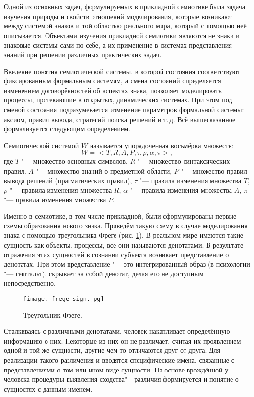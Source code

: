 Одной из основных задач, формулируемых в прикладной семиотике была задача изучения природы и свойств отношений моделирования, которые возникают между системой знаков и той областью реального мира, который с помощью неё описывается. Объектами изучения прикладной семиотики являются не знаки и знаковые системы сами по себе, а  их применение в системах представления знаний при решении различных практических задач.

Введение понятия семиотической системы, в которой состояния соответствуют фиксированным формальным системам, а смена состояний определяется изменением договорённостей об аспектах знака, позволяет моделировать процессы, протекающие в открытых, динамических системах. При этом под сменой состояния подразумевается изменение параметров формальной системы: аксиом, правил вывода, стратегий поиска решений и т.\,д. Всё вышесказанное формализуется следующим определением.

\begin{Def}
	Семиотической системой $W$ называется упорядоченная восьмёрка множеств:
	\[
		W=<T,R,A,P,\tau,\rho,\alpha,\pi>,
	\] 
	где	$T$ "--- множество основных символов, $R$ "--- множество синтаксических правил, $A$ "--- множество знаний о предметной области, $P$ "--- множество правил вывода решений (прагматических правил), $\tau$ "--- правила изменения множества $T$, $\rho$ "--- правила изменения множества $R$, $\alpha$ "--- правила изменения множества $A$, $\pi$ "--- правила изменения множества $P$.
\end{Def}

Именно в семиотике, в том числе прикладной, были сформулированы первые схемы образования нового знака. Приведём такую схему в случае моделирования знака с помощью треугольника Фреге (рис. \ref{fg:frege_sign}). В реальном мире имеются такие сущность как объекты, процессы, все они называются денотатами. В результате отражения этих сущностей в сознании субъекта возникает представление о денотатах. При этом представление "--- это интегрированный образ (в психологии "--- гештальт), скрывает за собой денотат, делая его не доступным непосредственно.

\begin{figure}[h]
	\centering
	\texttt{[image: frege\_sign.jpg]}
	\caption{Треугольник Фреге.}
	\label{fg:frege_sign}
\end{figure}

Сталкиваясь с различными денотатами, человек накапливает определённую информацию о них. Некоторые из них он не различает, считая их проявлением одной и той же сущности, другие чем-то отличаются друг от друга. Для реализации такого различения и вводятся специфические имена, связанные с представлениями о том или ином виде сущности. На основе врождённой у человека процедуры выявления сходства"--~различия формируется и понятие о сущностях с данным именем.


